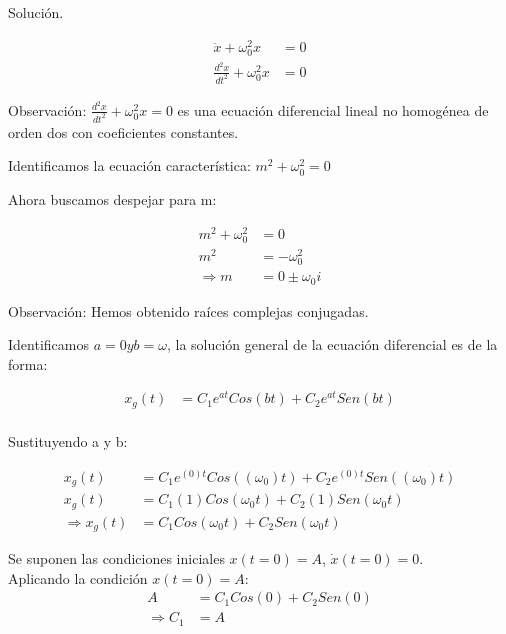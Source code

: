 

 Solución.

 \begin{align*}
    \ddot{x} + \omega_{0}^{2} x &= 0 \\
    \frac{d^{2} x}{dt^{2}} + \omega_{0}^{2} x &= 0 
\end{align*}

Observación: $\frac{d^{2} x}{dt^{2}} + \omega_{0}^{2} x = 0 $ es una ecuación diferencial lineal
no homogénea de orden dos con coeficientes constantes.

\vspace*{0.3 cm}

Identificamos la ecuación característica: $ m^{2} + \omega_{0}^{2} = 0 $

Ahora buscamos despejar para m:

\begin{align*}
    m^{2} + \omega_{0}^{2} &= 0 \\
    m^{2}  &= - \omega_{0}^{2} \\
    \Rightarrow m &= 0 \pm \omega_{0} i
\end{align*}

Observación: Hemos obtenido raíces complejas conjugadas.

\vspace*{0.3 cm}

Identificamos $ a=0 y b=\omega $, la solución general de la ecuación diferencial
es de la forma:

\begin{align*}
    x_{g}(t) &= C_{1}e^{at}Cos(bt) + C_{2}e^{at}Sen(bt) \\
\end{align*}

Sustituyendo a y b:

\begin{align*}
    x_{g}(t) &= C_{1}e^{(0)t}Cos((\omega_{0})t) + C_{2}e^{(0)t}Sen((\omega_{0})t) \\
    x_{g}(t) &= C_{1}(1)Cos(\omega_{0}t) + C_{2}(1)Sen(\omega_{0}t) \\
    \Rightarrow x_{g}(t) &= C_{1}Cos(\omega_{0}t) + C_{2}Sen(\omega_{0}t)
\end{align*}

Se suponen las condiciones iniciales $x(t=0)=A$, $\dot{x}(t=0)=0$.\\
Aplicando la condición $x(t=0)=A$:
\begin{align*}
    A &= C_{1}Cos(0)+C_{2}Sen(0)\\
    \Rightarrow C_{1} &= A
\end{align*}

